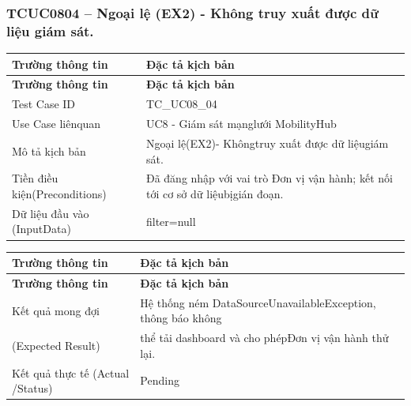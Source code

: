 \subsubsection{TCUC0804 – Ngoại lệ (EX2) - Không truy xuất được dữ liệu giám sát.}
\begin{longtable}{|L{0.24\textwidth}|L{0.70\textwidth}|}
\hline
\textbf{Trường thông tin} & \textbf{Đặc tả kịch bản} \\
\hline
\endfirsthead
\hline
\textbf{Trường thông tin} & \textbf{Đặc tả kịch bản} \\
\hline
\endhead
Test Case ID & TC\_UC08\_04 \\
\hline
Use Case liênquan & UC8 - Giám sát mạnglưới MobilityHub \\
\hline
Mô tả kịch bản & Ngoại lệ(EX2)- Khôngtruy xuất được dữ liệugiám sát. \\
\hline
Tiền điều kiện\newline (Preconditions) & Đã đăng nhập với vai trò Đơn vị vận hành; kết nối tới cơ sở dữ liệu\newline bịgián đoạn. \\
\hline
Dữ liệu đầu vào (Input\newline Data) & filter=null \\
\hline
\end{longtable}
\vspace{-0.5\baselineskip}
\begin{longtable}{|L{0.24\textwidth}|L{0.70\textwidth}|}
\hline
\textbf{Trường thông tin} & \textbf{Đặc tả kịch bản} \\
\hline
\endfirsthead
\hline
\textbf{Trường thông tin} & \textbf{Đặc tả kịch bản} \\
\hline
\endhead
Kết quả mong đợi & Hệ thống ném DataSourceUnavailableException, thông báo không \\
\hline
(Expected Result) & thể tải dashboard và cho phépĐơn vị vận hành thử lại. \\
\hline
Kết quả thực tế (Actual /\newline Status) & Pending \\
\hline
\end{longtable}
\vspace{-0.5\baselineskip}
